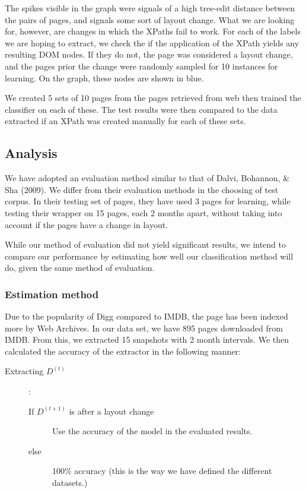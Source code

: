	The spikes visible in the graph were signals of a high tree-edit distance between the pairs
of pages, and signals some sort of layout change. What we are looking for, however, are changes
in which the XPaths fail to work. For each of the labels we are hoping to extract, we check the
if the application of the XPath yields any resulting DOM nodes. If they do not, the page was
considered a layout change, and the pages prior the change were randomly sampled for 10 instances
for learning. On the graph, these nodes are shown in blue.

	 We created 5 sets of 10 pages from the pages retrieved from web
then trained the classifier on each of these. The test results were then compared to the data
extracted if an XPath was created manually for each of these sets.
 
 
\subsection{Analysis} 
	We have adopted an evaluation method similar to that of Dalvi, Bohannon, \& Sha (2009).
We differ from their evaluation methods in the choosing of test corpus. In their testing
set of pages, they have used 3 pages for learning, while testing their wrapper on 15 pages,
each 2 months apart, without taking into account if the pages have a change in layout.

	While our method of evaluation did not yield significant results, we intend to compare
our performance by estimating how well our classification method will do, given the same
method of evaluation.
\subsubsection{Estimation method}
Due to the popularity of Digg compared to IMDB, the page has been indexed more by Web Archives.
In our data set, we have 895 pages downloaded from IMDB. From this, we extracted 15 snapshots
with 2 month intervals. We then calculated the accuracy of the extractor in the following manner:
\begin{description}
\item[Extracting $D^{(t)}$]:
\begin{description}
	\item[If $D^{(t+1)}$ is after a layout change] Use the accuracy of the model in the evaluated results.
	\item[else] 100\% accuracy (this is the way we have defined the different datasets.)
\end{description}
\end{description}


